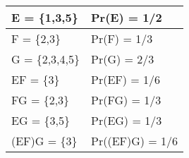 \begin{tabular}{|l|l|}\hline
E = \{1,3,5\}	&Pr(E) = 1/2\\\hline
F = \{2,3\}	&Pr(F) = 1/3\\\hline
G = \{2,3,4,5\}	&Pr(G) = 2/3\\\hline
EF = \{3\}	&Pr(EF) = 1/6\\\hline
FG = \{2,3\}	&Pr(FG) = 1/3\\\hline
EG = \{3,5\}	&Pr(EG) = 1/3\\\hline
(EF)G = \{3\}	&Pr((EF)G) = 1/6\\\hline
\end{tabular}
